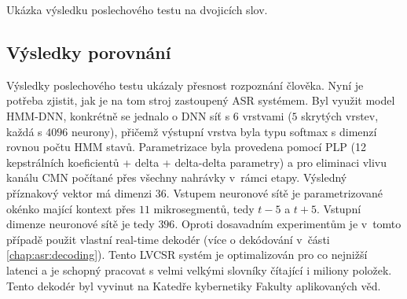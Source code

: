 \begin{table}[htpb]
  \centering
  \def\arraystretch{1.5}
  \caption{Ukázka výsledku poslechového testu na dvojicích slov.}
  \label{tab:realisation:listening:bigrams}
\end{table}

\subsection{Výsledky porovnání}
\label{chap:realisation:comparison}

Výsledky poslechového testu ukázaly přesnost rozpoznání člověka.
Nyní je potřeba zjistit, jak je na tom stroj zastoupený ASR systémem.
Byl využit model HMM-DNN, konkrétně se jednalo o DNN síť s $6$ vrstvami ($5$ skrytých vrstev, každá s $4096$ neurony), přičemž výstupní vrstva byla typu softmax s dimenzí rovnou počtu HMM stavů.
Parametrizace byla provedena pomocí PLP (12 kepstrálních koeficientů + delta + delta-delta parametry) a pro eliminaci vlivu kanálu CMN počítané přes všechny nahrávky v~rámci etapy.
Výsledný příznakový vektor má dimenzi $36$.
Vstupem neuronové sítě je parametrizované okénko mající kontext přes $11$ mikrosegmentů, tedy $t-5$ a $t+5$.
Vstupní dimenze neuronové sítě je tedy $396$.
Oproti dosavadním experimentům je v~tomto případě použit vlastní real-time dekodér (více o dekódování v~části \ref{chap:asr:decoding}).
Tento LVCSR systém je optimalizován pro co nejnižší latenci a je schopný pracovat s velmi velkými slovníky čítající i miliony položek.
Tento dekodér byl vyvinut na Katedře kybernetiky Fakulty aplikovaných věd.

